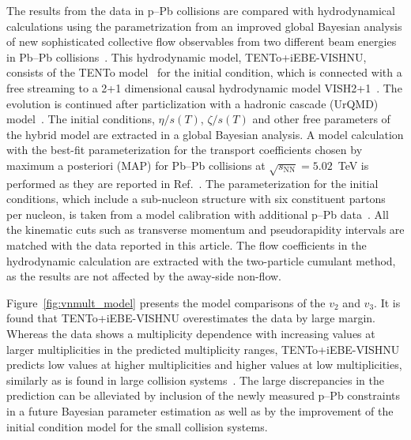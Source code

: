 The results from the data in p--Pb collisions are compared with hydrodynamical calculations using the parametrization from an improved global
Bayesian analysis of new sophisticated collective flow observables
 from two different beam energies in Pb--Pb collisions~\cite{Parkkila:2021yha}. This hydrodynamic model, {TENTo}+iEBE-VISHNU, consists of the {TENTo} model~\cite{Moreland:2014oya} for the initial condition, which is connected with a free streaming to a 2+1 dimensional causal hydrodynamic model VISH2+1~\cite{Shen:2014vra}. The evolution is continued after particlization with a hadronic cascade (UrQMD) model~\cite{Bass:1998ca,Bleicher:1999xi}. The initial conditions, $\eta/s(T)$, $\zeta/s(T)$ and other free parameters of the hybrid model are extracted in a global Bayesian analysis.
A model calculation with the best-fit parameterization for the transport coefficients chosen by maximum a posteriori (MAP) for Pb--Pb collisions at $\sqrt{s_{\text{NN}}}=5.02$~TeV is performed as they are reported in Ref.~\cite{Parkkila:2021yha}. The parameterization for the initial conditions, which include a sub-nucleon structure with six constituent partons per nucleon, is taken from a model calibration with additional p--Pb data~\cite{Moreland:2018gsh}. All the kinematic cuts such as transverse momentum and pseudorapidity intervals are matched with the data reported in this article. The flow coefficients in the hydrodynamic calculation are extracted with the two-particle cumulant method, as the results are not affected by the away-side non-flow.

Figure~\ref{fig:vnmult_model} presents the model comparisons of the $v_2$ and $v_3$. It is found that {TENTo}+iEBE-VISHNU overestimates the data by large margin. Whereas the data shows a multiplicity dependence with increasing values at larger multiplicities in the predicted multiplicity ranges, {TENTo}+iEBE-VISHNU predicts low values at higher multiplicities and higher values at low multiplicities, similarly as is found in large collision systems~\cite{Acharya:2020taj}. The large discrepancies in the prediction can be alleviated by inclusion of the newly measured p--Pb constraints in a future Bayesian parameter estimation as well as by the improvement of the initial condition model for the small collision systems.

